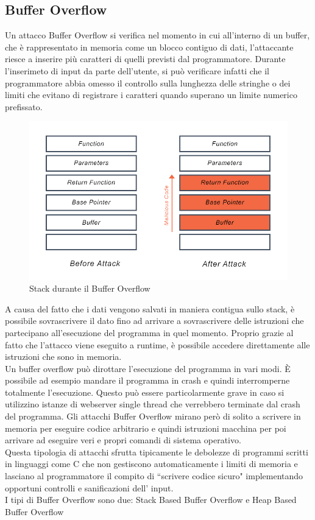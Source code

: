 \subsection*{Buffer Overflow}
Un attacco Buffer Overflow si verifica nel momento in cui all'interno di un buffer, che è rappresentato in memoria come un blocco contiguo di dati, l'attaccante riesce a inserire più caratteri di quelli previsti dal programmatore.
Durante l'inserimeto di input da parte dell'utente, si può verificare infatti che il programmatore abbia omesso il controllo sulla lunghezza delle stringhe o dei limiti che evitano di registrare i caratteri quando superano un limite numerico prefissato. 
\vspace{1cm}
\FloatBarrier
\begin{figure}[!htbp]
    \centering
    \includegraphics[width=0.5\linewidth]{images/buffer-overflow-diagram.png}
    \caption{Stack durante il Buffer Overflow}
\end{figure}
\FloatBarrier
A causa del fatto che i dati vengono salvati in maniera contigua sullo stack, è possibile sovrascrivere il dato fino ad arrivare a sovrascrivere delle istruzioni che partecipano all'esecuzione del programma in quel momento. Proprio grazie al fatto che l'attacco viene eseguito a runtime, è possibile accedere direttamente alle istruzioni che sono in memoria. \\
\newline
Un buffer overflow può dirottare l'esecuzione del programma in vari modi. È possibile ad esempio mandare il programma in crash e quindi interromperne totalmente l'esecuzione. Questo può essere particolarmente grave in caso si utilizzino istanze di webserver single thread che verrebbero terminate dal crash del programma. Gli attacchi Buffer Overflow mirano però di solito a scrivere in memoria per eseguire codice arbitrario e quindi istruzioni macchina per poi arrivare ad eseguire veri e propri comandi di sistema operativo. \\
\newline
Questa tipologia di attacchi sfrutta tipicamente le debolezze di programmi scritti in linguaggi come C che non gestiscono automaticamente i limiti di memoria e lasciano al programmatore il compito di ``scrivere codice sicuro" implementando opportuni controlli e sanificazioni dell' input. \\
\newline
I tipi di Buffer Overflow sono due: Stack Based Buffer Overflow e Heap Based Buffer Overflow

